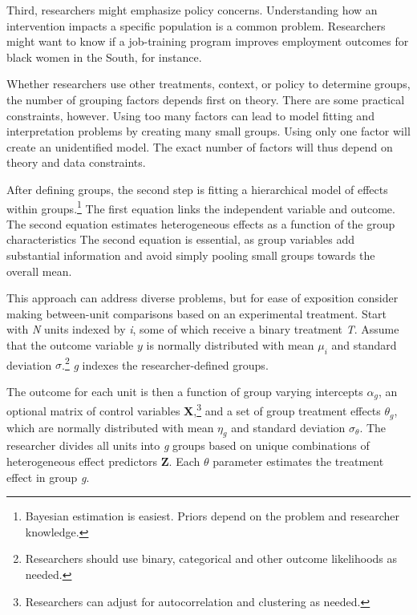 \documentclass[12pt]{article}
\begin{document}
Third, researchers might emphasize policy concerns.
Understanding how an intervention impacts a specific population is a common problem.
Researchers might want to know if a job-training program improves employment outcomes for black women in the South, for instance.  


Whether researchers use other treatments, context, or policy to determine groups, the number of grouping factors depends first on theory.
There are some practical constraints, however.
Using too many factors can lead to model fitting and interpretation problems by creating many small groups.
Using only one factor will create an unidentified model.
The exact number of factors will thus depend on theory and data constraints.  



After defining groups, the second step is fitting a hierarchical model of effects within groups.\footnote{Bayesian estimation is easiest. Priors depend on the problem and researcher knowledge.} 
The first equation links the independent variable and outcome.
The second equation estimates heterogeneous effects as a function of the group characteristics  
The second equation is essential, as group variables add substantial information and avoid simply pooling small groups towards the overall mean.


This approach can address diverse problems, but for ease of exposition consider making between-unit comparisons based on an experimental treatment.    
Start with \textit{N} units indexed by \textit{i}, some of which receive a binary treatment \textit{T}.
Assume that the outcome variable ${y}$ is normally distributed with mean $\mu_i$ and standard deviation $\sigma$.\footnote{Researchers should use binary, categorical and other outcome likelihoods as needed.}
\textit{g} indexes the researcher-defined groups. 


The outcome for each unit is then a function of group varying intercepts $\alpha_g$, an optional matrix of control variables \textbf{X},\footnote{Researchers can adjust for autocorrelation and clustering as needed.} and a set of group treatment effects $\theta_g$, which are normally distributed with mean $\eta_g$ and standard deviation $\sigma_\theta$. 
The researcher divides all units into \textit{g} groups based on unique combinations of heterogeneous effect predictors \textbf{Z}. 
Each $\theta$ parameter estimates the treatment effect in group \textit{g}.%
\end{document}
